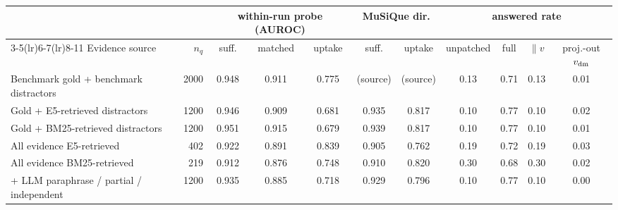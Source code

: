 \begin{tabular}{lrccccccccc}
\toprule
& & \multicolumn{3}{c}{within-run probe (AUROC)} & \multicolumn{2}{c}{MuSiQue dir.} & \multicolumn{4}{c}{answered rate} \\
\cmidrule(lr){3-5}\cmidrule(lr){6-7}\cmidrule(lr){8-11}
Evidence source & $n_q$ & suff. & matched & uptake & suff. & uptake & unpatched & full & $\parallel v$ & proj.-out $v_{\mathrm{dm}}$ \\
\midrule
Benchmark gold + benchmark distractors & 2000 & 0.948 & 0.911 & 0.775 & (source) & (source) & 0.13 & 0.71 & 0.13 & 0.01 \\
Gold + E5-retrieved distractors & 1200 & 0.946 & 0.909 & 0.681 & 0.935 & 0.817 & 0.10 & 0.77 & 0.10 & 0.02 \\
Gold + BM25-retrieved distractors & 1200 & 0.951 & 0.915 & 0.679 & 0.939 & 0.817 & 0.10 & 0.77 & 0.10 & 0.01 \\
All evidence E5-retrieved & 402 & 0.922 & 0.891 & 0.839 & 0.905 & 0.762 & 0.19 & 0.72 & 0.19 & 0.03 \\
All evidence BM25-retrieved & 219 & 0.912 & 0.876 & 0.748 & 0.910 & 0.820 & 0.30 & 0.68 & 0.30 & 0.02 \\
+ LLM paraphrase / partial / independent & 1200 & 0.935 & 0.885 & 0.718 & 0.929 & 0.796 & 0.10 & 0.77 & 0.10 & 0.00 \\
\bottomrule
\end{tabular}